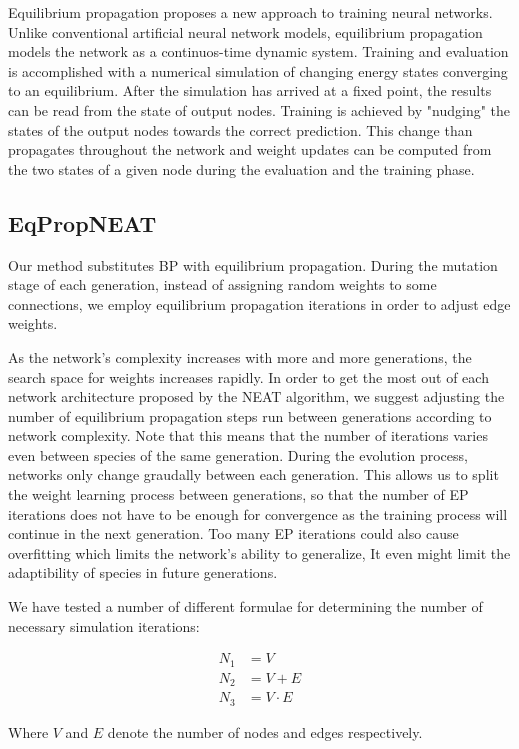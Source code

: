 \documentclass[lettersize,journal]{IEEEtran}
\newcommand{\eqprop}{EP }
\begin{document}
Equilibrium propagation proposes a new approach to training neural networks. Unlike conventional artificial neural network models, equilibrium propagation models the network as a continuos-time dynamic system. Training and evaluation is accomplished with a numerical simulation of changing energy states converging to an equilibrium. After the simulation has arrived at a fixed point, the results can be read from the state of output nodes. Training is achieved by "nudging" the states of the output nodes towards the correct prediction. This change than propagates throughout the network and weight updates can be computed from the two states of a given node during the evaluation and the training phase.

\subsection{EqPropNEAT}
Our method substitutes BP with equilibrium propagation. During the mutation stage of each generation, instead of assigning random weights to some connections, we employ equilibrium propagation iterations in order to adjust edge weights.

As the network's complexity increases with more and more generations, the search space for weights increases rapidly. In order to get the most out of each network architecture proposed by the NEAT algorithm, we suggest adjusting the number of equilibrium propagation steps run between generations according to network complexity. Note that this means that the number of iterations varies even between species of the same generation. During the evolution process, networks only change graudally between each generation. This allows us to split the weight learning process between generations, so that the number of \eqprop iterations does not have to be enough for convergence as the training process will continue in the next generation. Too many \eqprop iterations could also cause overfitting which limits the network's ability to generalize, It even might limit the adaptibility of species in future generations. 

We have tested a number of different formulae for determining the number of necessary simulation iterations:

\begin{align}
  N_1 &= V\\
  N_2 &= V+E\\
  N_3 &= V\cdot E
\end{align}

Where $V$ and $E$ denote the number of nodes and edges respectively. 
\end{document}
